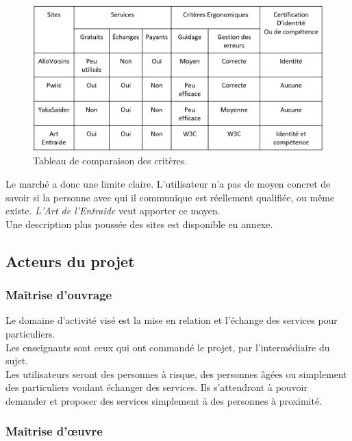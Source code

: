 \documentclass[a4paper,11pt]{article}
\begin{document}
\begin{figure}[H]
  \includegraphics[width=\linewidth]{images/tableau-ergo.png}
  \caption{Tableau de comparaison des critères.}
  \label{fig:table1}
\end{figure}

Le marché a donc une limite claire. L'utilisateur n'a pas de moyen concret de savoir si la personne avec qui il communique est réellement qualifiée, ou même existe.
\textit{L'Art de l'Entraide} veut apporter ce moyen.\\

Une description plus poussée des sites est disponible en annexe.\\


\subsection{Acteurs du projet}
\subsubsection{Maîtrise d’ouvrage}

Le domaine d’activité visé est la mise en relation et l’échange des services pour particuliers.\\

Les enseignants sont ceux qui ont commandé le projet, par l’intermédiaire du sujet.\\

Les utilisateurs seront des personnes à risque, des personnes âgées ou simplement des particuliers
voulant échanger des services. Ils s’attendront à pouvoir demander et proposer des services
simplement à des personnes à proximité.\\

\subsubsection{Maîtrise d'œuvre}
\end{document}
